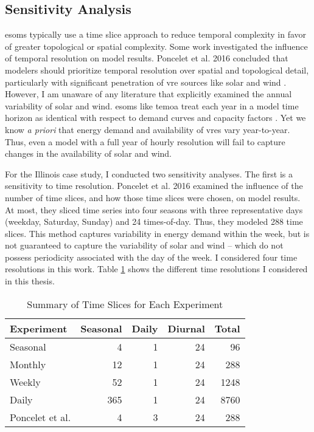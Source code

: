 \subsection{Sensitivity Analysis}

\glspl{esom} typically use a time slice approach to reduce temporal complexity
in favor of greater topological or spatial complexity. Some work investigated the
influence of temporal resolution on model results. Poncelet et al. 2016
concluded that modelers should prioritize temporal resolution over spatial and
topological detail, particularly with significant penetration of \gls{vre}
sources like solar and wind \cite{poncelet_impact_2016}. However,
I am unaware of any literature that explicitly examined the annual variability
of solar and wind. \glspl{esom} like \gls{temoa} treat each year in a model
time horizon as identical with respect to demand curves and capacity factors
\cite{hunter_modeling_2013}. Yet
we know \textit{a priori} that energy demand and availability of \glspl{vre}
vary year-to-year. Thus, even a model with a full year of hourly resolution
will fail to capture changes in the availability of solar and wind.

For the Illinois case study, I conducted two sensitivity analyses. The first is a
sensitivity to time resolution. Poncelet et al. 2016 examined the influence of
the number of time slices, and how those time slices were chosen, on model results.
At most, they sliced time series into four seasons with three representative days (weekday,
Saturday, Sunday) and 24 times-of-day. Thus, they modeled 288 time slices. This
method captures variability in energy demand within the week, but is not guaranteed
to capture the variability of solar and wind -- which do not possess periodicity
associated with the day of the week. I considered four time resolutions in this work.
Table \ref{tab:time-slice} shows the different time resolutions I considered in this thesis.

\begin{table}[H]
  \centering
  \caption{Summary of Time Slices for Each Experiment}
  \label{tab:time-slice}
  \begin{tabular}{lrrrr}
    \toprule
    Experiment & Seasonal & Daily & Diurnal & Total\\
    \midrule
    Seasonal & 4 & 1 & 24 & 96\\
    Monthly & 12 & 1 & 24 & 288\\
    Weekly & 52 & 1 & 24 & 1248\\
    Daily & 365 & 1 & 24 & 8760\\
    \midrule
    Poncelet et al. \cite{poncelet_impact_2016} & 4 & 3 &  24 & 288\\
    \bottomrule
  \end{tabular}
\end{table}

